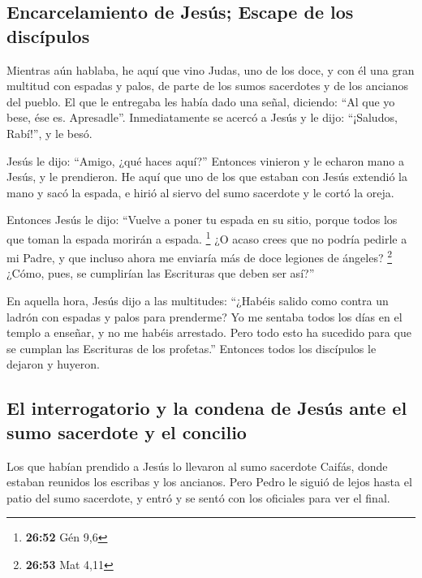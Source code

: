 \hypertarget{encarcelamiento-de-jesuxfas-escape-de-los-discuxedpulos}{%
\subsection{Encarcelamiento de Jesús; Escape de los
discípulos}\label{encarcelamiento-de-jesuxfas-escape-de-los-discuxedpulos}}

 Mientras aún hablaba, he aquí que vino Judas, uno de los
doce, y con él una gran multitud con espadas y palos, de parte de los
sumos sacerdotes y de los ancianos del pueblo.  El que le
entregaba les había dado una señal, diciendo: ``Al que yo bese, ése es.
Apresadle''.  Inmediatamente se acercó a Jesús y le dijo:
``¡Saludos, Rabí!'', y le besó.

 Jesús le dijo: ``Amigo, ¿qué haces aquí?'' Entonces
vinieron y le echaron mano a Jesús, y le prendieron.  He
aquí que uno de los que estaban con Jesús extendió la mano y sacó la
espada, e hirió al siervo del sumo sacerdote y le cortó la oreja.

 Entonces Jesús le dijo: ``Vuelve a poner tu espada en su
sitio, porque todos los que toman la espada morirán a espada.
\footnote{\textbf{26:52} Gén 9,6}  ¿O acaso crees que no
podría pedirle a mi Padre, y que incluso ahora me enviaría más de doce
legiones de ángeles? \footnote{\textbf{26:53} Mat 4,11} 
¿Cómo, pues, se cumplirían las Escrituras que deben ser así?''

 En aquella hora, Jesús dijo a las multitudes: ``¿Habéis
salido como contra un ladrón con espadas y palos para prenderme? Yo me
sentaba todos los días en el templo a enseñar, y no me habéis arrestado.
 Pero todo esto ha sucedido para que se cumplan las
Escrituras de los profetas.'' Entonces todos los discípulos le dejaron y
huyeron.

\hypertarget{el-interrogatorio-y-la-condena-de-jesuxfas-ante-el-sumo-sacerdote-y-el-concilio}{%
\subsection{El interrogatorio y la condena de Jesús ante el sumo
sacerdote y el
concilio}\label{el-interrogatorio-y-la-condena-de-jesuxfas-ante-el-sumo-sacerdote-y-el-concilio}}

 Los que habían prendido a Jesús lo llevaron al sumo
sacerdote Caifás, donde estaban reunidos los escribas y los ancianos.
 Pero Pedro le siguió de lejos hasta el patio del sumo
sacerdote, y entró y se sentó con los oficiales para ver el final.

